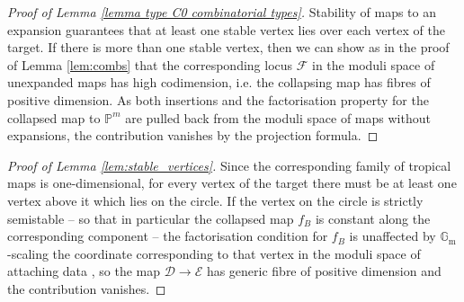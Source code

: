 \documentclass[11pt]{amsart}
\renewcommand{\to}{\rightarrow}
\newcommand{\Gm}{\mathbb{G}_{\text{m}}}
\newcommand{\Dcal}{\mathcal{D}}
\newcommand{\Ecal}{\mathcal{E}}
\newcommand{\Fcal}{\mathcal{F}}
\theoremstyle{definition}
\newtheorem{lemma}[thm]{Lemma}
\theoremstyle{definition}
\begin{document}


\begin{proof}[Proof of Lemma \ref{lemma type C0 combinatorial types}]
Stability of maps to an expansion guarantees that at least one stable vertex lies over each vertex of the target. If there is more than one stable vertex, then we can show as in the proof of Lemma \ref{lem:combs} that the corresponding locus $\Fcal$ in the moduli space of unexpanded maps has high codimension, i.e. the collapsing map has fibres of positive dimension. As both insertions and the factorisation property for the collapsed map to $\mathbb P^m$ are pulled back from the moduli space of maps without expansions, the contribution vanishes by the projection formula.
\end{proof}
\begin{proof}[Proof of Lemma \ref{lem:stable_vertices}]
Since the corresponding family of tropical maps is one-dimensional, for every vertex of the target there must be at least one vertex above it which lies on the circle. If the vertex on the circle is strictly semistable -- so that in particular the collapsed map $f_B$ is constant along the corresponding component -- the factorisation condition for $f_B$ is unaffected by $\Gm$-scaling the coordinate corresponding to that vertex in the moduli space of attaching data \cite[\S 2.2]{SMY2}, so the map $\Dcal\to\Ecal$ has generic fibre of positive dimension and the contribution vanishes.
\end{proof}
\end{document}
